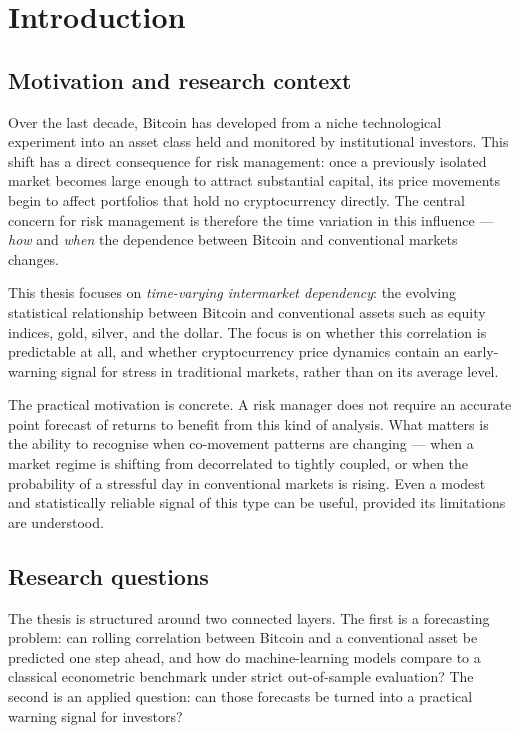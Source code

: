 \section{Introduction}

\subsection{Motivation and research context}

Over the last decade, Bitcoin has developed from a niche technological experiment into an asset class held and monitored by institutional investors. This shift has a direct consequence for risk management: once a previously isolated market becomes large enough to attract substantial capital, its price movements begin to affect portfolios that hold no cryptocurrency directly. The central concern for risk management is therefore the time variation in this influence --- \emph{how} and \emph{when} the dependence between Bitcoin and conventional markets changes.

This thesis focuses on \emph{time-varying intermarket dependency}: the evolving statistical relationship between Bitcoin and conventional assets such as equity indices, gold, silver, and the dollar. The focus is on whether this correlation is predictable at all, and whether cryptocurrency price dynamics contain an early-warning signal for stress in traditional markets, rather than on its average level.

The practical motivation is concrete. A risk manager does not require an accurate point forecast of returns to benefit from this kind of analysis. What matters is the ability to recognise when co-movement patterns are changing --- when a market regime is shifting from decorrelated to tightly coupled, or when the probability of a stressful day in conventional markets is rising. Even a modest and statistically reliable signal of this type can be useful, provided its limitations are understood.

\subsection{Research questions}

The thesis is structured around two connected layers. The first is a forecasting problem: can rolling correlation between Bitcoin and a conventional asset be predicted one step ahead, and how do machine-learning models compare to a classical econometric benchmark under strict out-of-sample evaluation? The second is an applied question: can those forecasts be turned into a practical warning signal for investors?

